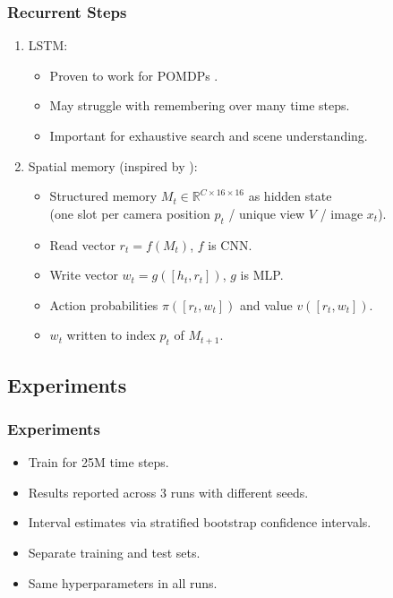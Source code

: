 \begin{frame}
    \frametitle{Recurrent Steps}

    \begin{enumerate}
        \item LSTM:
        \begin{itemize}
            \item Proven to work for POMDPs \cite{hausknecht_stone_2017,mnih_asynchronous_2016,mirowski_navigate_2017,gupta_cognitive_2019}.
            \item May struggle with remembering over many time steps.
            \item Important for exhaustive search and scene understanding.
        \end{itemize}
        \item Spatial memory (inspired by \cite{parisotto_salakhutdinov_2017}):
        \begin{itemize}
            \item Structured memory \(M_t \in \mathbb{R}^{C \times 16 \times 16}\) as hidden state \\
            (one slot per camera position \(p_t\) / unique view \(V\) / image \(x_t\)).
            \item Read vector \(r_t = f(M_t)\), \(f\) is CNN.
            \item Write vector \(w_t = g(\left\lbrack h_t, r_t \right\rbrack)\), \(g\) is MLP.
            \item Action probabilities \(\pi(\left\lbrack r_t, w_t \right\rbrack)\) and value \(v(\left\lbrack r_t, w_t \right\rbrack)\).
            \item \(w_t\) written to index \(p_t\) of \(M_{t+1}\).
        \end{itemize}
    \end{enumerate}
\end{frame}

\subsection{Experiments}

\begin{frame}
    \frametitle{Experiments}

    \begin{itemize}
        \item Train for 25M time steps.
        \item Results reported across 3 runs with different seeds.
        \item Interval estimates via stratified bootstrap confidence intervals.
        \item Separate training and test sets.
        \item Same hyperparameters in all runs.
    \end{itemize}
\end{frame}

